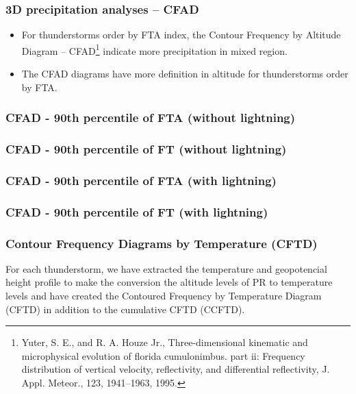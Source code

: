 \documentclass[smaller]{beamer}
\begin{document}
\begin{frame}
\frametitle{3D precipitation analyses -- CFAD}
\begin{itemize}

\item For thunderstorms order by FTA index, the Contour Frequency by Altitude Diagram -- CFAD\footnote{Yuter, S. E., and R. A. Houze Jr., Three-dimensional kinematic and microphysical evolution of florida cumulonimbus.
part ii: Frequency distribution of vertical velocity, reflectivity, and differential reflectivity, J. Appl. Meteor., 123,
1941–1963, 1995.} indicate more precipitation in mixed region.
\item The CFAD diagrams have more definition in altitude for thunderstorms order by FTA.
\end{itemize}
\end{frame}
  
\begin{frame}
\frametitle{CFAD - 90th percentile of FTA (without lightning)}

\end{frame}

\begin{frame}
\frametitle{CFAD - 90th percentile of FT (without lightning)}

\end{frame}

\begin{frame}
\frametitle{CFAD - 90th percentile of FTA (with lightning) }

\end{frame}

\begin{frame}
\frametitle{CFAD - 90th percentile of FT (with lightning)}

\end{frame}




\begin{frame}
\frametitle{Contour Frequency Diagrams by Temperature (CFTD)}
For each thunderstorm, we have extracted the temperature and
geopotencial height profile to make the conversion the altitude levels of PR to temperature levels and have created the Contoured Frequency by Temperature Diagram (CFTD) in addition to the cumulative CFTD (CCFTD).
\end{frame}
\end{document}
